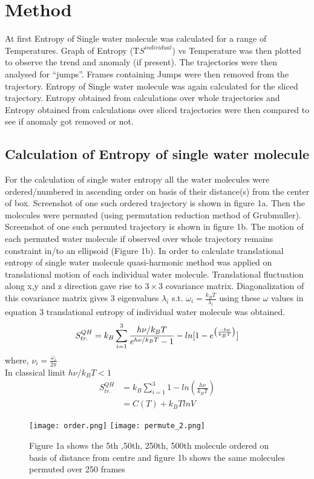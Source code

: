 \documentclass{article}[a4paper,12pt,twoside]
\begin{document}
\section{Method}
At first Entropy of Single water molecule was calculated for a range of Temperatures. Graph of Entropy (T$S^{individual}$) vs Temperature was then plotted to observe the 
trend and anomaly (if present). The trajectories were then analysed for ``jumps''. Frames containing Jumps were then removed from the trajectory. Entropy of Single water molecule was again calculated for the sliced trajectory. Entropy obtained from calculations over whole trajectories and Entropy obtained from calculations over sliced trajectories were
then compared to see if anomaly got removed or not.
\subsection{Calculation of Entropy of single water molecule}
For the calculation of single water entropy all the water molecules were ordered/numbered in ascending order on basis of their distance(s) from the center of box. Screenshot of
one such ordered trajectory is shown in figure 1a. Then the molecules were permuted (using permutation reduction method of Grubmuller). Screenshot of one such permuted trajectory is shown in figure 1b. The motion of each permuted water molecule if observed over whole trajectory remains constraint in/to an ellipsoid (Figure 1b). In order to calculate 
translational entropy of single water molecule quasi-harmonic method was applied on translational motion of each individual
water molecule. Translational fluctuation along x,y and z direction gave rise to $3 \times 3$ covariance matrix. Diagonalization of this covariance matrix gives 3 eigenvalues
$\lambda_i$ s.t. $\omega_i = \frac{k_BT}{\lambda_i}$ using these $\omega$ values in equation 3 translational entropy of individual water molecule was obtained.
\begin{equation}
	\scriptsize{S_{tr.}^{QH}=k_B \sum_{i=1}^{3} \frac{h\nu/k_BT}{e^{h\nu/k_BT}-1} - ln[1-e^{\left( \frac{-h\nu}{k_BT}\right)}]}
\end{equation}
where, $ \nu_i=\frac{\omega_i}{2\pi} $ \\ In classical limit $ h\nu/k_BT < 1 $
\begin{equation}
	\begin{split}
		S_{tr.}^{QH} & = k_B \sum_{i=1}^{3} 1-ln\left(\frac{h\nu}{k_BT}\right) \\
					 & = C(T)+k_BTlnV
	\end{split}
\end{equation}
\begin{figure}
\texttt{[image: order.png]}
\texttt{[image: permute\_2.png]}
\caption{Figure 1a shows the 5th ,50th, 250th, 500th molecule ordered on basis of distance from centre and figure 1b shows the same molecules permuted over 250 frames }
\end{figure}
\end{document}
